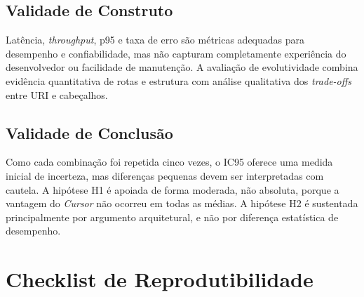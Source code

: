 \documentclass[journal]{IEEEtran}
\begin{document}
\subsection{Validade de Construto}

Latência, \textit{throughput}, p95 e taxa de erro são métricas adequadas para desempenho e confiabilidade, mas não capturam completamente experiência do desenvolvedor ou facilidade de manutenção. A avaliação de evolutividade combina evidência quantitativa de rotas e estrutura com análise qualitativa dos \textit{trade-offs} entre URI e cabeçalhos.

\subsection{Validade de Conclusão}

Como cada combinação foi repetida cinco vezes, o IC95 oferece uma medida inicial de incerteza, mas diferenças pequenas devem ser interpretadas com cautela. A hipótese H1 é apoiada de forma moderada, não absoluta, porque a vantagem do \textit{Cursor} não ocorreu em todas as médias. A hipótese H2 é sustentada principalmente por argumento arquitetural, e não por diferença estatística de desempenho.


\section{Checklist de Reprodutibilidade}
\end{document}
